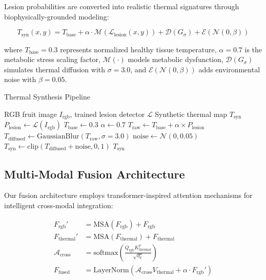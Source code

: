 \documentclass[conference]{IEEEtran}
\begin{document}
Lesion probabilities are converted into realistic thermal signatures through biophysically-grounded modeling:

\begin{equation}
    T_{\text{syn}}(x,y) = T_{\text{base}} + \alpha \cdot \mathcal{M}(\mathcal{L}_{\text{lesion}}(x,y)) + \mathcal{D}(G_{\sigma}) + \mathcal{E}(\mathcal{N}(0,\beta))
\end{equation}

where $T_{\text{base}} = 0.3$ represents normalized healthy tissue temperature, $\alpha = 0.7$ is the metabolic stress scaling factor, $\mathcal{M}(\cdot)$ models metabolic dysfunction, $\mathcal{D}(G_{\sigma})$ simulates thermal diffusion with $\sigma = 3.0$, and $\mathcal{E}(\mathcal{N}(0,\beta))$ adds environmental noise with $\beta = 0.05$.

\begin{algorithm}[htbp]
    \caption{Thermal Synthesis Pipeline}
    \label{alg:thermal}
    \begin{algorithmic}[1]
        \REQUIRE RGB fruit image $I_{\text{rgb}}$, trained lesion detector $\mathcal{L}$
        \ENSURE Synthetic thermal map $T_{\text{syn}}$
        \STATE $P_{\text{lesion}} \leftarrow \mathcal{L}(I_{\text{rgb}})$
        \STATE $T_{\text{base}} \leftarrow 0.3$
        \STATE $\alpha \leftarrow 0.7$
        \STATE $T_{\text{raw}} \leftarrow T_{\text{base}} + \alpha \times P_{\text{lesion}}$
        \STATE $T_{\text{diffused}} \leftarrow \text{GaussianBlur}(T_{\text{raw}}, \sigma=3.0)$
        \STATE $\text{noise} \leftarrow \mathcal{N}(0, 0.05)$
        \STATE $T_{\text{syn}} \leftarrow \text{clip}(T_{\text{diffused}} + \text{noise}, 0, 1)$
        \RETURN $T_{\text{syn}}$
    \end{algorithmic}
\end{algorithm}

\subsection{Multi-Modal Fusion Architecture}

Our fusion architecture employs transformer-inspired attention mechanisms for intelligent cross-modal integration:

\begin{align}
    F_{\text{rgb}}' &= \text{MSA}(F_{\text{rgb}}) + F_{\text{rgb}} \\
    F_{\text{thermal}}' &= \text{MSA}(F_{\text{thermal}}) + F_{\text{thermal}} \\
    \mathcal{A}_{\text{cross}} &= \text{softmax}\left(\frac{Q_{\text{rgb}} K_{\text{thermal}}^T}{\sqrt{d_k}}\right) \\
    F_{\text{fused}} &= \text{LayerNorm}(\mathcal{A}_{\text{cross}} V_{\text{thermal}} + \alpha \cdot F_{\text{rgb}}')
\end{align}
\end{document}
